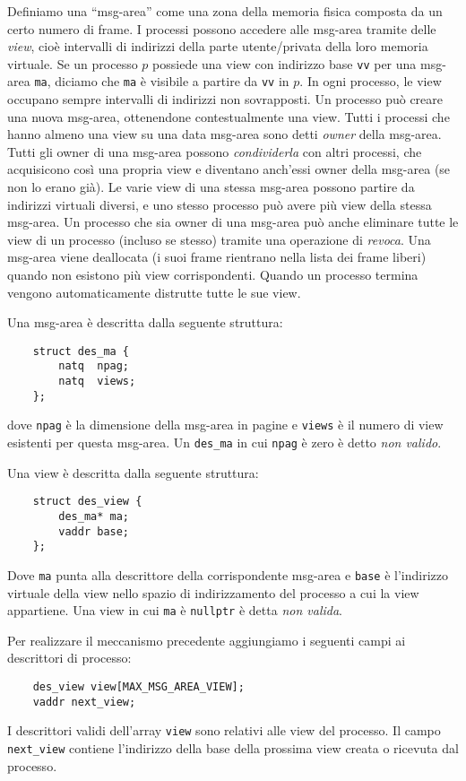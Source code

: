 Definiamo una ``msg-area'' come una zona della memoria fisica composta da un certo numero di frame.
I processi possono accedere alle msg-area tramite delle {\em view}, cio\`e intervalli di indirizzi della parte utente/privata della loro memoria virtuale.
Se un processo $p$ possiede una view con indirizzo base \verb|vv| per una msg-area \verb|ma|, diciamo che \verb|ma| \`e visibile a partire da \verb|vv|
in $p$.
In ogni processo, le view occupano sempre intervalli di indirizzi non sovrapposti.
Un processo pu\`o creare una nuova msg-area, ottenendone contestualmente una view.
Tutti i processi che hanno almeno una view su una data msg-area sono detti {\em owner} della msg-area. Tutti gli owner di una msg-area possono
{\em condividerla} con altri processi, che acquisicono cos\`i una propria view e diventano anch'essi owner della msg-area (se non lo erano gi\`a).
Le varie view di una stessa msg-area possono partire da indirizzi virtuali diversi, e uno stesso processo pu\`o avere pi\`u view della stessa
msg-area.
Un processo che sia owner di una msg-area pu\`o anche eliminare tutte le view di un processo (incluso se stesso)
tramite una operazione di {\em revoca}.
Una msg-area viene deallocata (i suoi frame rientrano nella lista dei frame liberi) quando non esistono pi\`u view corrispondenti.
Quando un processo termina vengono automaticamente distrutte tutte le sue view.

Una msg-area \`e descritta dalla seguente struttura:
\begin{verbatim}
    struct des_ma {
        natq  npag;
        natq  views;
    };
\end{verbatim}
dove \verb|npag| \`e la dimensione della msg-area in pagine e \verb|views| \`e il numero di view esistenti per questa msg-area.
Un \verb|des_ma| in cui \verb|npag| \`e zero \`e detto {\em non valido}.

Una view \`e descritta dalla seguente struttura:
\begin{verbatim}
    struct des_view {
        des_ma* ma;
        vaddr base;
    };
\end{verbatim}
Dove \verb|ma| punta alla descrittore della corrispondente msg-area e \verb|base| \`e l'indirizzo virtuale della view nello
spazio di indirizzamento del processo a cui la view appartiene. Una view in cui \verb|ma| \`e \verb|nullptr| \`e detta {\em non valida}.

Per realizzare il meccanismo precedente aggiungiamo i seguenti campi ai descrittori di processo:
\begin{verbatim}
    des_view view[MAX_MSG_AREA_VIEW];
    vaddr next_view;
\end{verbatim}
I descrittori validi dell'array \verb|view| sono relativi alle view del processo. Il campo
\verb|next_view| contiene l'indirizzo della base della prossima view creata o ricevuta dal processo.

